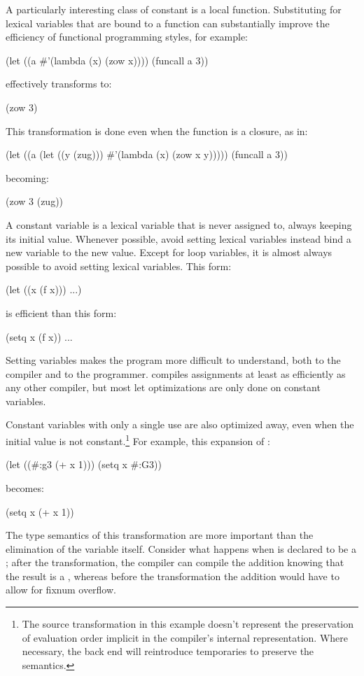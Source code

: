 {A particularly interesting class of constant is a local function.  Substituting
for lexical variables that are bound to a function can substantially improve
the efficiency of functional programming styles, for example:
\begin{lisp}
(let ((a #'(lambda (x) (zow x))))
  (funcall a 3))
\end{lisp}
effectively transforms to:
\begin{lisp}
(zow 3)
\end{lisp}
This transformation is done even when the function is a closure, as in:
\begin{lisp}
(let ((a (let ((y (zug)))
           #'(lambda (x) (zow x y)))))
  (funcall a 3))
\end{lisp}
becoming:
\begin{lisp}
(zow 3 (zug))
\end{lisp}

A constant variable is a lexical variable that is never assigned to, always
keeping its initial value.  Whenever possible, avoid setting lexical variables
\dash{} instead bind a new variable to the new value.  Except for loop variables,
it is almost always possible to avoid setting lexical variables.  This form:
\begin{example}
(let ((x (f x)))
  ...)
\end{example}
is  efficient than this form:
\begin{example}
(setq x (f x))
...
\end{example}
Setting variables makes the program more difficult to understand, both to the
compiler and to the programmer.  \python{} compiles assignments at least as
efficiently as any other \llisp{} compiler, but most let optimizations are only
done on constant variables.

Constant variables with only a single use are also optimized away, even when
the initial value is not constant.\footnote{The source transformation in this
example doesn't represent the preservation of evaluation order implicit in the
compiler's internal representation.  Where necessary, the back end will
reintroduce temporaries to preserve the semantics.}  For example, this
expansion of :
\begin{lisp}
(let ((#:g3 (+ x 1)))
  (setq x #:G3))
\end{lisp}
becomes:
\begin{lisp}
(setq x (+ x 1))
\end{lisp}
The type semantics of this transformation are more important than the
elimination of the variable itself.  Consider what happens when  is
declared to be a ; after the transformation, the compiler can compile
the addition knowing that the result is a , whereas before the
transformation the addition would have to allow for fixnum overflow.

}
